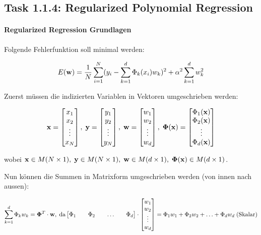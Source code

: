 \subsection{Task 1.1.4: Regularized Polynomial Regression}


\paragraph{Regularized Regression Grundlagen}

Folgende Fehlerfunktion soll minimal werden:

$$ E(\mathbf{w}) = \frac{1}{N} \sum_{i=1}^N(y_i - \sum_{k=1}^d \Phi_k(x_i) w_k)^2 + \alpha^2 \sum_{k=1}^d w_k^2 $$

Zuerst müssen die indizierten Variablen in Vektoren umgeschrieben werden:

$$ \mathbf{x} = \begin{bmatrix} x_1 \\ x_2 \\ \vdots \\ x_N \end{bmatrix}, \; \mathbf{y} = \begin{bmatrix} y_1 \\ y_2 \\ \vdots \\ y_N \end{bmatrix}, \; \mathbf{w} = \begin{bmatrix} w_1 \\ w_2 \\ \vdots \\ w_d \end{bmatrix}, \; \mathbf{\Phi}(\mathbf{x}) = \begin{bmatrix} \Phi_1(\mathbf{x}) \\ \Phi_2(\mathbf{x}) \\ \vdots \\ \Phi_d(\mathbf{x}) \end{bmatrix} $$

wobei $ \mathbf{x} \in M(N \times 1), \; \mathbf{y} \in M(N \times 1), \; \mathbf{w} \in M(d \times 1), \; \mathbf{\Phi}(\mathbf{x}) \in M(d \times 1) $.

Nun können die Summen in Matrixform umgeschrieben werden (von innen nach aussen):

$$ \sum_{k=1}^d \Phi_k w_k = \mathbf{\Phi}^T \cdot \mathbf{w}, \; \text{da} \begin{bmatrix} \Phi_1 && \Phi_2 && \hdots && \Phi_d \end{bmatrix} \cdot \begin{bmatrix} w_1 \\ w_2 \\ \vdots \\ w_d \end{bmatrix} = \Phi_1 w_1 + \Phi_2 w_2 + \hdots + \Phi_d w_d \; \text{(Skalar)} $$

